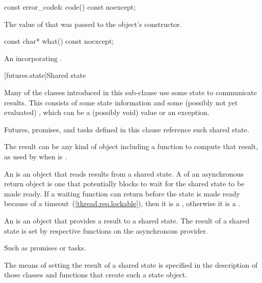 %
%
\begin{itemdecl}
const error_code& code() const noexcept;
\end{itemdecl}

\begin{itemdescr}
\pnum
\returns The value of  that was passed to the object's constructor.
\end{itemdescr}

%
%
\begin{itemdecl}
const char* what() const noexcept;
\end{itemdecl}

\begin{itemdescr}
\pnum
\returns An \ntbs incorporating .
\end{itemdescr}

[futures.state]{Shared state}

\pnum
Many of the classes introduced in this sub-clause use some state to communicate results. This
 consists of some state information and some (possibly not
yet evaluated) , which can be a (possibly void) value or an exception. \begin{note}
Futures, promises, and tasks defined in this clause reference such shared state. \end{note}

\pnum
\begin{note} The result can be any kind of object including a function to compute that result,
as used by  when  is . \end{note}

\pnum
An  is an object that reads results from a
shared state. A  of an asynchronous return object is one
that potentially blocks to wait for the shared state to be made
ready.
If a waiting function can return before the state is made ready because of a
timeout~(\ref{thread.req.lockable}), then it is a , otherwise
it is a .

\pnum
An  is an object that provides a result to a shared
state.
The result of a shared state is set by
respective functions on the asynchronous provider. \begin{note} Such as promises or tasks.
\end{note} The means of setting the result of a shared state is specified
in the description of those classes and functions that create such a state object.

